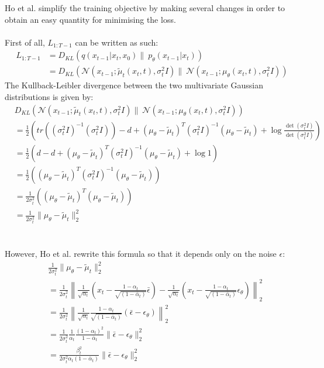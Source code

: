 \documentclass{article}
\begin{document}
Ho et al. \cite{ho2020denoising} simplify the training objective by making several changes in order to obtain an easy quantity for minimising the loss. 
\\\\
First of all, $L_{1: T-1}$ can be written as such:
\begin{align}
  L_{1:T-1} &= D_{KL}\left(q\left(x_{t-1} | x_t, x_0\right) \| \: p_{\theta}\left(x_{t-1} | x_t\right)\right) \\
  &= D_{KL}\left(\mathcal{N} (x_{t-1}; \tilde{\mu}_t \left(x_t, t \right), \sigma^2_t I ) \| \: \mathcal{N} \left( x_{t-1} ; \mu_{\theta}(x_t, t), \sigma^2_t I  \right) \right)
\end{align}
{
  \allowdisplaybreaks
  The Kullback-Leibler divergence between the two multivariate Gaussian distributions is given by:
  \begin{align}
    & D_{KL}\left(\mathcal{N} (x_{t-1}; \tilde{\mu}_t \left(x_t, t \right), \sigma^2_t I ) \| \: \mathcal{N} \left( x_{t-1} ; \mu_{\theta}(x_t, t), \sigma^2_t I  \right) \right) \\
    &= \frac{1}{2} \left( tr\left( (\sigma^2_t I)^{-1} (\sigma^2_t I) \right) - d + \left( \mu_{\theta} - \tilde{\mu}_t \right)^T (\sigma^2_t I)^{-1} \left( \mu_{\theta} - \tilde{\mu}_t \right) + \log \frac{\det(\sigma^2_t I)}{\det(\sigma^2_t I)} \right) \\
    &= \frac{1}{2} \left( d - d + \left( \mu_{\theta} - \tilde{\mu}_t \right)^T (\sigma^2_t I)^{-1} \left( \mu_{\theta} - \tilde{\mu}_t \right) + \log 1 \right) \\
    &= \frac{1}{2} \left( \left( \mu_{\theta} - \tilde{\mu}_t \right)^T (\sigma^2_t I)^{-1} \left( \mu_{\theta} - \tilde{\mu}_t \right) \right) \\
    &= \frac{1}{2 \sigma^2_t} \left( \left( \mu_{\theta} - \tilde{\mu}_t \right)^T \left( \mu_{\theta} - \tilde{\mu}_t \right) \right) \\
    &= \frac{1}{2 \sigma^2_t} \| \mu_{\theta} - \tilde{\mu}_t \|_2^2
  \end{align}
  \\\\
  However, Ho et al. \cite{ho2020denoising} rewrite this formula so that it depends only on the noise $\epsilon$:
  \begin{align}
    & \frac{1}{2 \sigma^2_t} \| \mu_{\theta} - \tilde{\mu}_t \|_2^2 \\
    &= \frac{1}{2 \sigma^2_t} \left\| \frac{1}{\sqrt{\alpha_t}} \left( x_t - \frac{1 - \alpha_t}{\sqrt{(1 - \bar{\alpha}_t)}} \bar{\epsilon} \right) - \frac{1}{\sqrt{\alpha_t}} \left( x_t - \frac{1 - \alpha_t}{\sqrt{(1 - \bar{\alpha}_t)}} \epsilon_\theta \right)\right\|_2^2 \\
    &= \frac{1}{2 \sigma^2_t} \left\| \frac{1}{\sqrt{\alpha_t}} \frac{1 - \alpha_t}{\sqrt{(1 - \bar{\alpha}_t)}} (\bar{\epsilon} - \epsilon_\theta) \right\|_2^2 \\
    &= \frac{1}{2 \sigma^2_t} \frac{1}{\alpha_t} \frac{(1 - \alpha_t)^2}{1 - \bar{\alpha}_t} \| \bar{\epsilon} - \epsilon_\theta \|_2^2 \\
    &= \frac{\beta_t^2}{2 \sigma^2_t \alpha_t (1 - \bar{\alpha}_t)} \| \bar{\epsilon} - \epsilon_\theta \|_2^2
  \end{align}
}
\end{document}
